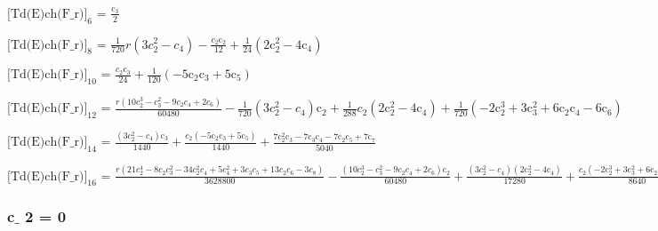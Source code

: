 \documentclass{article}
\newcommand{\unicode}[1]{{}}
\begin{document}
\noindent\(\text{[Td(E)ch(F$\_$r)]}_6\text{ = }\frac{\text{c$\unicode{02bc}$}_3}{2}\)

\noindent\(\text{[Td(E)ch(F$\_$r)]}_8\text{ = }\frac{1}{720} r \left(3 c_2^2-c_4\right)-\frac{c_2 \text{c$\unicode{02bc}$}_2}{12}+\frac{1}{24} \left(2
\text{c$\unicode{02bc}$}_2^2-4 \text{c$\unicode{02bc}$}_4\right)\)

\noindent\(\text{[Td(E)ch(F$\_$r)]}_{10}\text{ = }\frac{c_2 \text{c$\unicode{02bc}$}_3}{24}+\frac{1}{120} \left(-5 \text{c$\unicode{02bc}$}_2 \text{c$\unicode{02bc}$}_3+5
\text{c$\unicode{02bc}$}_5\right)\)

\noindent\(\text{[Td(E)ch(F$\_$r)]}_{12}\text{ = }\frac{r \left(10 c_2^3-c_3^2-9 c_2 c_4+2 c_6\right)}{60480}-\frac{1}{720} \left(3 c_2^2-c_4\right)
\text{c$\unicode{02bc}$}_2+\frac{1}{288} c_2 \left(2 \text{c$\unicode{02bc}$}_2^2-4 \text{c$\unicode{02bc}$}_4\right)+\frac{1}{720} \left(-2 \text{c$\unicode{02bc}$}_2^3+3
\text{c$\unicode{02bc}$}_3^2+6 \text{c$\unicode{02bc}$}_2 \text{c$\unicode{02bc}$}_4-6 \text{c$\unicode{02bc}$}_6\right)\)

\noindent\(\text{[Td(E)ch(F$\_$r)]}_{14}\text{ = }\frac{\left(3 c_2^2-c_4\right) \text{c$\unicode{02bc}$}_3}{1440}+\frac{c_2 \left(-5 \text{c$\unicode{02bc}$}_2
\text{c$\unicode{02bc}$}_3+5 \text{c$\unicode{02bc}$}_5\right)}{1440}+\frac{7 \text{c$\unicode{02bc}$}_2^2 \text{c$\unicode{02bc}$}_3-7 \text{c$\unicode{02bc}$}_3
\text{c$\unicode{02bc}$}_4-7 \text{c$\unicode{02bc}$}_2 \text{c$\unicode{02bc}$}_5+7 \text{c$\unicode{02bc}$}_7}{5040}\)

\noindent\(\text{[Td(E)ch(F$\_$r)]}_{16}\text{ = }\frac{r \left(21 c_2^4-8 c_2 c_3^2-34 c_2^2 c_4+5 c_4^2+3 c_3 c_5+13 c_2 c_6-3 c_8\right)}{3628800}-\frac{\left(10
c_2^3-c_3^2-9 c_2 c_4+2 c_6\right) \text{c$\unicode{02bc}$}_2}{60480}+\frac{\left(3 c_2^2-c_4\right) \left(2 \text{c$\unicode{02bc}$}_2^2-4 \text{c$\unicode{02bc}$}_4\right)}{17280}+\frac{c_2
\left(-2 \text{c$\unicode{02bc}$}_2^3+3 \text{c$\unicode{02bc}$}_3^2+6 \text{c$\unicode{02bc}$}_2 \text{c$\unicode{02bc}$}_4-6 \text{c$\unicode{02bc}$}_6\right)}{8640}+\frac{2
\text{c$\unicode{02bc}$}_2^4-8 \text{c$\unicode{02bc}$}_2 \text{c$\unicode{02bc}$}_3^2-8 \text{c$\unicode{02bc}$}_2^2 \text{c$\unicode{02bc}$}_4+4
\text{c$\unicode{02bc}$}_4^2+8 \text{c$\unicode{02bc}$}_3 \text{c$\unicode{02bc}$}_5+8 \text{c$\unicode{02bc}$}_2 \text{c$\unicode{02bc}$}_6-8 \text{c$\unicode{02bc}$}_8}{40320}\)

\subsubsection*{c$\_$ 2 = 0}
\end{document}
